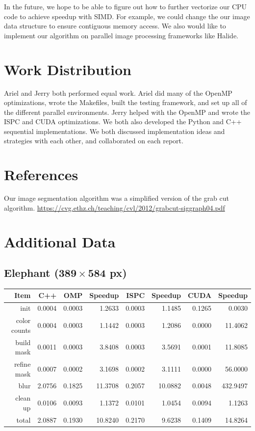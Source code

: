 \documentclass[12pt]{article}
\begin{document}
In the future, we hope to be able to figure out how to further vectorize our
CPU code to achieve speedup with SIMD. For example, we could change the our
image data structure to ensure contiguous memory access. We also would like to
implement our algorithm on parallel image processing frameworks like Halide.

\section{Work Distribution}

Ariel and Jerry both performed equal work. Ariel did many of the OpenMP
optimizations, wrote the Makefiles, built the testing framework, and set up all
of the different parallel environments. Jerry helped with the OpenMP and wrote
the ISPC and CUDA optimizations. We both also developed the Python and C++
sequential implementations. We both discussed implementation ideas and
strategies with each other, and collaborated on each report.

\section{References}

Our image segmentation algorithm was a simplified version of the grab cut
algorithm. \url{https://cvg.ethz.ch/teaching/cvl/2012/grabcut-siggraph04.pdf}

\section{Additional Data}

\subsection{Elephant ($\mathbf{389 \times 584}$ px)}

\begin{tabular}{r|r|r|r|r|r|r|r}
    Item & C++ & OMP & Speedup & ISPC & Speedup & CUDA & Speedup
\\  \hline
    init & 0.0004 & 0.0003 & 1.2633 & 0.0003 & 1.1485 & 0.1265 & 0.0030
\\  color counts & 0.0004 & 0.0003 & 1.1442 & 0.0003 & 1.2086 & 0.0000 & 11.4062
\\  build mask & 0.0011 & 0.0003 & 3.8408 & 0.0003 & 3.5691 & 0.0001 & 11.8085
\\  refine mask & 0.0007 & 0.0002 & 3.1698 & 0.0002 & 3.1111 & 0.0000 & 56.0000
\\  blur & 2.0756 & 0.1825 & 11.3708 & 0.2057 & 10.0882 & 0.0048 & 432.9497
\\  clean up & 0.0106 & 0.0093 & 1.1372 & 0.0101 & 1.0454 & 0.0094 & 1.1263
\\  \hline
    total & 2.0887 & 0.1930 & 10.8240 & 0.2170 & 9.6238 & 0.1409 & 14.8264
\end{tabular}
\end{document}
